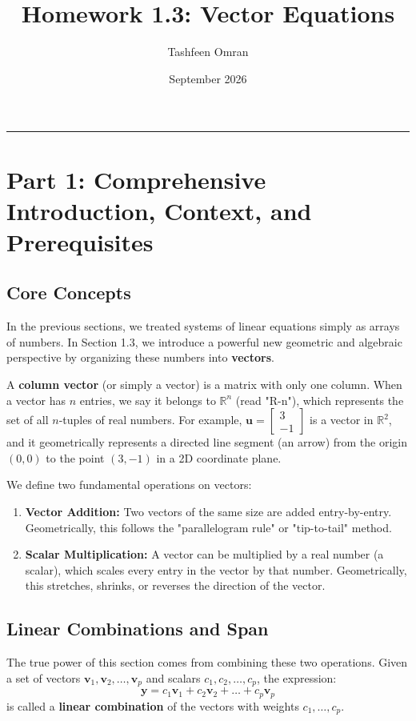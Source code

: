 \documentclass[11pt]{article}
\title{\textbf{Homework 1.3: Vector Equations}}
\author{Tashfeen Omran}
\date{September 2026}
\begin{document}
\maketitle
\tableofcontents
\vspace{1cm}
\hrule
\vspace{1cm}

\section{Part 1: Comprehensive Introduction, Context, and Prerequisites}

\subsection{Core Concepts}
In the previous sections, we treated systems of linear equations simply as arrays of numbers. In Section 1.3, we introduce a powerful new geometric and algebraic perspective by organizing these numbers into \textbf{vectors}. 

A \textbf{column vector} (or simply a vector) is a matrix with only one column. When a vector has $n$ entries, we say it belongs to $\mathbb{R}^n$ (read "R-n"), which represents the set of all $n$-tuples of real numbers.
For example, $\mathbf{u} = \begin{bmatrix} 3 \\ -1 \end{bmatrix}$ is a vector in $\mathbb{R}^2$, and it geometrically represents a directed line segment (an arrow) from the origin $(0,0)$ to the point $(3, -1)$ in a 2D coordinate plane.

We define two fundamental operations on vectors:
\begin{enumerate}
    \item \textbf{Vector Addition:} Two vectors of the same size are added entry-by-entry. Geometrically, this follows the "parallelogram rule" or "tip-to-tail" method.
    \item \textbf{Scalar Multiplication:} A vector can be multiplied by a real number (a scalar), which scales every entry in the vector by that number. Geometrically, this stretches, shrinks, or reverses the direction of the vector.
\end{enumerate}

\subsection{Linear Combinations and Span}
The true power of this section comes from combining these two operations. Given a set of vectors $\mathbf{v}_1, \mathbf{v}_2, \dots, \mathbf{v}_p$ and scalars $c_1, c_2, \dots, c_p$, the expression:
\[ \mathbf{y} = c_1\mathbf{v}_1 + c_2\mathbf{v}_2 + \dots + c_p\mathbf{v}_p \]
is called a \textbf{linear combination} of the vectors with weights $c_1, \dots, c_p$.
\end{document}
